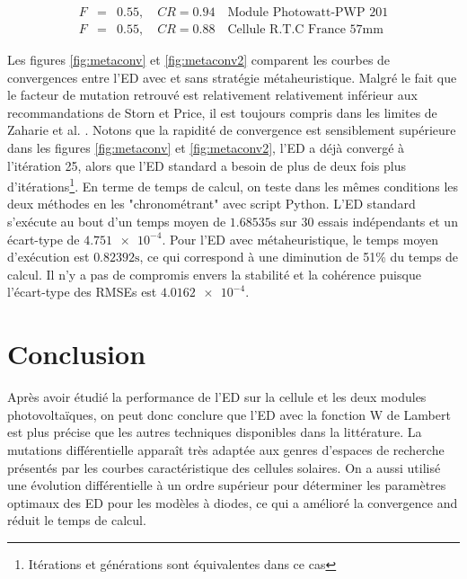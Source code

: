 \begin{eqnarray}
  F &=& 0.55, \quad CR = 0.94 \quad \text{Module Photowatt-PWP 201}\\
  F &=& 0.55, \quad CR = 0.88 \quad \text{Cellule R.T.C France 57mm}
\end{eqnarray}

Les figures \ref{fig:metaconv} et \ref{fig:metaconv2} comparent les courbes de convergences entre l'ED avec et sans stratégie métaheuristique. Malgré le fait que le facteur de mutation retrouvé est relativement relativement inférieur aux recommandations de Storn et Price, il est toujours compris dans les limites de Zaharie et al. \cite{Zaharie2002}. Notons que la rapidité de convergence est sensiblement supérieure dans les figures \ref{fig:metaconv} et \ref{fig:metaconv2}, l'ED a déjà convergé à l'itération 25, alors que l'ED standard a besoin de plus de deux fois plus d'itérations\footnote{Itérations et générations sont équivalentes dans ce cas}. En terme de temps de calcul, on teste dans les mêmes conditions les deux méthodes en les "chronométrant" avec script Python. L'ED standard s'exécute au bout d'un temps moyen de $1.68535 \si{\second}$ sur 30 essais indépendants et un écart-type de $\num{4.751e-4}$. Pour l'ED avec métaheuristique, le temps moyen d'exécution est $0.82392 \si{\second}$, ce qui correspond à une diminution de 51\% du temps de calcul. Il n'y a pas de compromis envers la stabilité et la cohérence puisque l'écart-type des RMSEs est $\num{4.0162e-4}$. 

\section{Conclusion}
Après avoir étudié la performance de l'ED sur la cellule et les deux modules photovoltaïques, on peut donc conclure que l'ED avec la fonction W de Lambert est plus précise que les autres techniques disponibles dans la littérature. La mutations différentielle apparaît très adaptée aux genres d'espaces de recherche présentés par les courbes caractéristique des cellules solaires. On a aussi utilisé une évolution différentielle à un ordre supérieur pour déterminer les paramètres optimaux des ED pour les modèles à diodes, ce qui a amélioré la convergence and réduit le temps de calcul.

